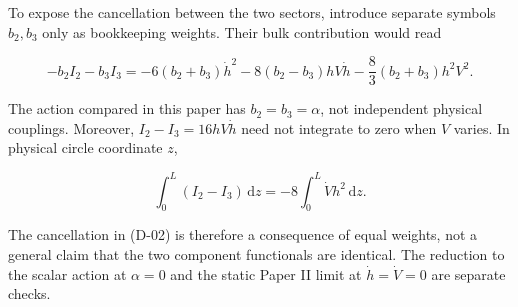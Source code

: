 To expose the cancellation between the two sectors, introduce separate symbols $b_2,b_3$ only as bookkeeping weights. Their bulk contribution would read

\begin{equation}\tag{B-04}\label{eq:B-04}
-b_2I_2-b_3I_3
=-6(b_2+b_3)\dot h^2-8(b_2-b_3)hV\dot h
-\frac83(b_2+b_3)h^2V^2.
\end{equation}

The action compared in this paper has $b_2=b_3=\alpha$, not independent physical couplings. Moreover, $I_2-I_3=16hV\dot h$ need not integrate to zero when $V$ varies. In physical circle coordinate $z$,

\begin{equation}\tag{B-05}\label{eq:B-05}
\int_0^L(I_2-I_3)\,\mathrm{d}z
=-8\int_0^L\dot V h^2\,\mathrm{d}z.
\end{equation}

The cancellation in (D-02) is therefore a consequence of equal weights, not a general claim that the two component functionals are identical. The reduction to the scalar action at $\alpha=0$ and the static Paper II limit at $\dot h=\dot V=0$ are separate checks.
